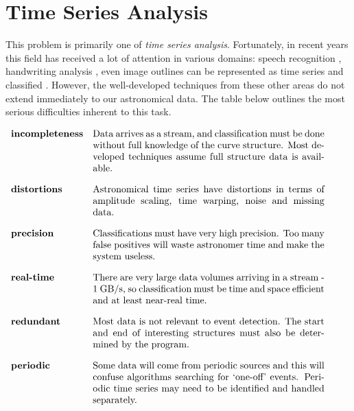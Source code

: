 \section{Time Series Analysis}
	This problem is primarily one of \emph{time series analysis}. Fortunately, in recent years this field has received a lot of attention in various domains: speech recognition \citep{sakoe1978dynamic}, handwriting analysis \citep{bahlmann2002online}, even image outlines can be represented as time series and classified \citep{ye2009time}. However, the well-developed techniques from these other areas do not extend immediately to our astronomical data. The table below outlines the most serious difficulties inherent to this task.
	\vspace{10pt}
	\begin{table*}[h!]

	\centering
	$\begin{array}{lp{0.7\textwidth}}
		\textbf{incompleteness} & Data arrives as a stream, and classification must be done without full knowledge of the curve structure. Most developed techniques assume full structure data is available. \vspace{10pt} \\
		\textbf{distortions} & Astronomical time series have distortions in terms of amplitude scaling, time warping, noise and missing data. \vspace{10pt} \\
		\textbf{precision} & Classifications must have very high precision. Too many false positives will waste astronomer time and make the system useless. \vspace{10pt} \\
		\textbf{real-time} & There are very large data volumes arriving in a stream - 1 GB/s, so classification must be time and space efficient and at least near-real time. \vspace{10pt} \\ 
		\textbf{redundant} & Most data is not relevant to event detection. The start and end of interesting structures must also be determined by the program. \vspace{10pt} \\
		\textbf{periodic} & Some data will come from periodic sources and this will confuse algorithms searching for `one-off' events. Periodic time series may need to be identified and handled separately.
	\end{array}$
	\caption{}
	\end{table*}
	
